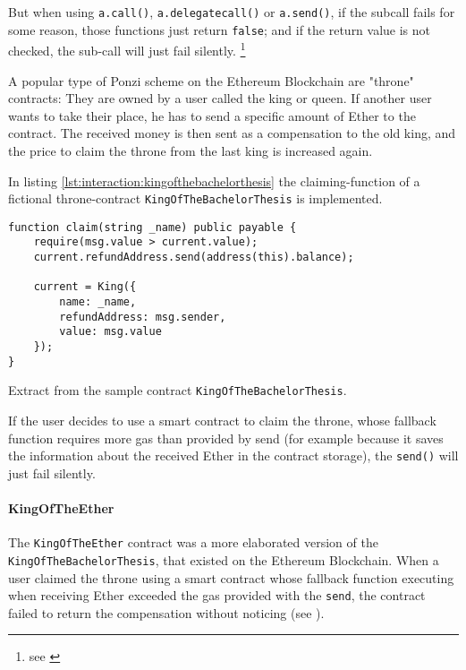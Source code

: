 But when using \texttt{a.call()}, \texttt{a.delegatecall()} or \texttt{a.send()}, if the subcall fails for some reason, those functions just return \texttt{false}; and if the return value is not checked, the sub-call will just fail silently. \footnote{see \cite[Exception disorder]{atzei:attacksurvey}}

A popular type of Ponzi scheme on the Ethereum Blockchain are "throne" contracts: They are owned by a user called the king or queen. If another user wants to take their place, he has to send a specific amount of Ether to the contract. The received money is then sent as a compensation to the old king, and the price to claim the throne from the last king is increased again.

In listing \ref{lst:interaction:kingofthebachelorthesis} the claiming-function of a fictional throne-contract \texttt{KingOfTheBachelorThesis} is implemented.

\begin{listing}[H]
	\begin{verbatim}
function claim(string _name) public payable {
    require(msg.value > current.value);
    current.refundAddress.send(address(this).balance);
    
    current = King({
        name: _name,
        refundAddress: msg.sender,
        value: msg.value
    });
}
    \end{verbatim}
	\caption{Extract from the sample contract \texttt{KingOfTheBachelorThesis}.}
	\label{lst:interaction:kingofthebachelorthesis}
\end{listing}

If the user decides to use a smart contract to claim the throne, whose fallback function  requires more gas than provided by send (for example because it saves the information about the received Ether in the contract storage), the \texttt{send()} will just fail silently.

\paragraph{KingOfTheEther}
The \texttt{KingOfTheEther} contract was a more elaborated version of the \texttt{King\-Of\-The\-Bachelor\-Thesis}, that existed on the Ethereum Blockchain. When a user claimed the throne using a smart contract whose fallback function executing when receiving Ether exceeded the gas provided with the \texttt{send}, the contract failed to return the compensation without noticing (see \cite{kingoftheether:postmortem}).

